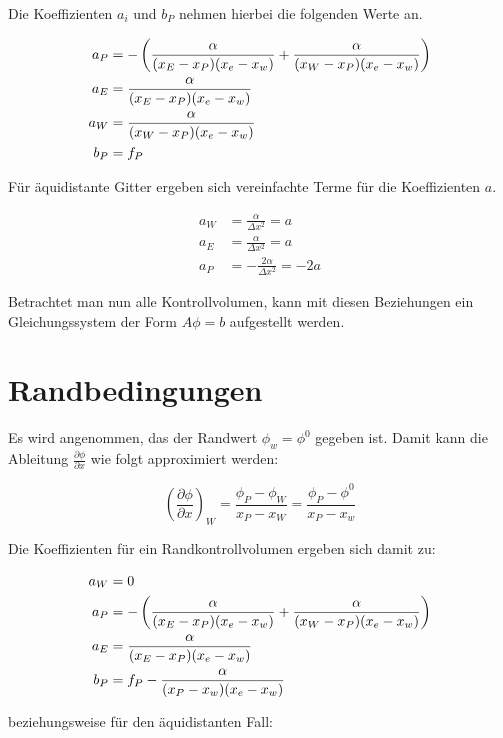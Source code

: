 \documentclass[ngerman,colorback,accentcolor=tud2d]{tudreport}
\begin{document}
Die Koeffizienten $a_i$ und $b_P$ nehmen hierbei die folgenden Werte an.

\begin{align*}
  a_P &= -\left( \frac{\alpha}{(x_E-x_P) (x_e-x_w)} + \frac{\alpha}{(x_W-x_P) (x_e-x_w)} \right) \\
a_E &= \frac{\alpha}{(x_E-x_P) (x_e-x_w)}\\
a_W &= \frac{\alpha}{(x_W-x_P) (x_e-x_w)}\\
b_P &= f_P
\end{align*}

Für äquidistante Gitter ergeben sich vereinfachte Terme für die Koeffizienten $a$.

\begin{align*}
  a_W &= \frac{\alpha}{\Delta x^2} = a\\
  a_E &= \frac{\alpha}{\Delta x^2} = a\\
  a_P &= - \frac{2 \alpha}{\Delta x^2} = -2a
\end{align*}

Betrachtet man nun alle Kontrollvolumen, kann mit diesen Beziehungen ein 
Gleichungssystem der Form $A\phi = b$ aufgestellt werden.

\section{Randbedingungen}
\label{sec:Randbedingungen}

Es wird angenommen, das der Randwert $\phi_w= \phi^0$ gegeben ist. Damit kann die
Ableitung $\frac{\partial \phi}{\partial x}$ wie folgt approximiert werden:

\begin{equation*}
\left(\frac{\partial \phi}{\partial x}\right)_W = \frac{\phi_P - \phi_W}{x_P - x_W} =
  \frac{\phi_P - \phi^0}{x_P - x_w}
\end{equation*}

Die Koeffizienten für ein Randkontrollvolumen ergeben sich damit zu:

\begin{align*}
  a_W &= 0\\
  a_P &=  -\left( \frac{\alpha}{(x_E-x_P) (x_e-x_w)} + \frac{\alpha}{(x_W-x_P) (x_e-x_w)} \right) \\
  a_E &= \frac{\alpha}{(x_E-x_P) (x_e-x_w)}\\
  b_P &= f_P - \frac{\alpha}{(x_P -x_w)(x_e-x_w)}
\end{align*}

beziehungsweise für den äquidistanten Fall:
\end{document}
